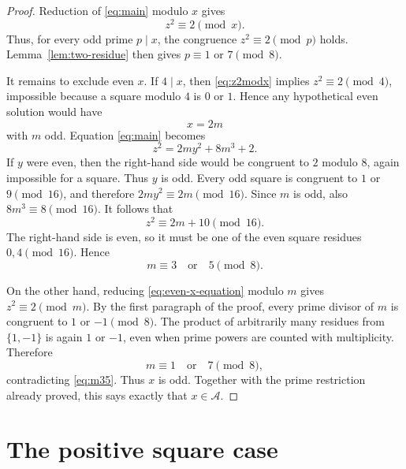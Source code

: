 \documentclass[a4paper,11pt]{amsart}
\numberwithin{equation}{section}
\theoremstyle{definition}
\theoremstyle{remark}
\newcommand{\Acal}{\mathcal A}
\begin{document}
\begin{proof}
Reduction of \eqref{eq:main} modulo \(x\) gives
\begin{equation}\label{eq:z2modx}
 z^2\equiv2\pmod x.
\end{equation}
Thus, for every odd prime \(p\mid x\), the congruence \(z^2\equiv2\pmod p\)
holds.  Lemma~\ref{lem:two-residue} then gives
\(p\equiv1\) or \(7\pmod8\).

It remains to exclude even \(x\).  If \(4\mid x\), then
\eqref{eq:z2modx} implies \(z^2\equiv2\pmod4\), impossible because a square
modulo \(4\) is \(0\) or \(1\).  Hence any hypothetical even solution would
have
\begin{equation}\label{eq:x2m}
 x=2m
\end{equation}
with \(m\) odd.  Equation \eqref{eq:main} becomes
\begin{equation}\label{eq:even-x-equation}
 z^2=2my^2+8m^3+2.
\end{equation}
If \(y\) were even, then the right-hand side would be congruent to \(2\)
modulo \(8\), again impossible for a square.  Thus \(y\) is odd.  Every odd
square is congruent to \(1\) or \(9\pmod{16}\), and therefore
\(2my^2\equiv2m\pmod{16}\).  Since \(m\) is odd, also
\(8m^3\equiv8\pmod{16}\).  It follows that
\begin{equation}\label{eq:z2mod16}
 z^2\equiv2m+10\pmod{16}.
\end{equation}
The right-hand side is even, so it must be one of the even square residues
\(0,4\pmod{16}\).  Hence
\begin{equation}\label{eq:m35}
 m\equiv3\quad\text{or}\quad5\pmod8.
\end{equation}

On the other hand, reducing \eqref{eq:even-x-equation} modulo \(m\) gives
\(z^2\equiv2\pmod m\).  By the first paragraph of the proof, every prime
divisor of \(m\) is congruent to \(1\) or \(-1\pmod8\).  The product of
arbitrarily many residues from \(\{1,-1\}\) is again \(1\) or \(-1\), even
when prime powers are counted with multiplicity.  Therefore
\begin{equation}\label{eq:mpm1}
 m\equiv1\quad\text{or}\quad7\pmod8,
\end{equation}
contradicting \eqref{eq:m35}.  Thus \(x\) is odd.  Together with the prime
restriction already proved, this says exactly that \(x\in\Acal\).
\end{proof}

\section{The positive square case}
\end{document}
